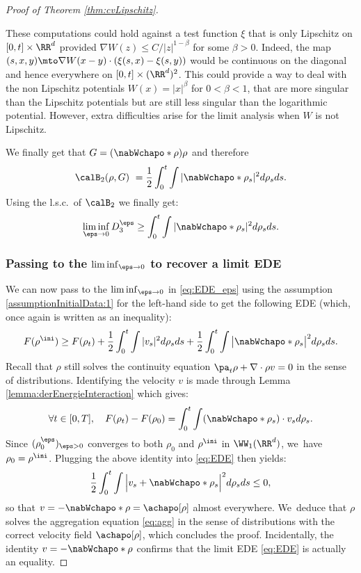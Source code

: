 \begin{proof}[Proof of Theorem \ref{thm:cvLipschitz}]
\begin{remark}
These computations could hold against a test function $\xi$ that is only Lipschitz on $[0,t] \times \RR^d$ provided $\nabla W(z) \leq C / |z|^{1-\beta}$ for some $\beta > 0$. Indeed, the map $(s,x,y) \mto \nabla W(x - y) \cdot \left( \xi(s, x) - \xi(s,y) \right)$ would be continuous on the diagonal and hence everywhere on $[0,t] \times (\RR^d)^2$. This could provide a way to deal with the non Lipschitz potentials $W(x) = |x|^\beta$ for $0<\beta<1$, that are more singular than the Lipschitz potentials but are still less singular than the logarithmic potential. However, extra difficulties arise for the limit analysis when $W$ is not Lipschitz.
\end{remark}

We finally get that $G = (\nabWchapo * \rho) \rho$ and therefore
\[
\calB_2(\rho, G)\ = \frac 12 \int_0^t \int |\nabWchapo * \rho_s|^2 d\rho_s ds.
\]
Using the l.s.c.\ of $\calB_2$ we finally get:
\[
\liminf_{\eps \to 0} D_3^\eps \geq \int_0^t \int |\nabWchapo * \rho_s|^2 d\rho_s ds.
\]
\subsubsection*{Passing to the $\liminf_{\eps \to 0}$ to recover a limit EDE}

We can now pass to the $\liminf_{\eps \to 0}$ in \eqref{eq:EDE_eps} using the assumption \eqref{assumptionInitialData:1} for the left-hand side to get the following EDE (which, once again is written as an inequality):
\begin{equation}\label{eq:EDE}
F(\rho^{\ini}) \geq F(\rho_t) + \frac 12 \int_0^t \int |v_s|^2 d\rho_s ds + \frac 12 \int_0^t \int \big| \nabWchapo * \rho_s \big|^2 d\rho_s ds.
\end{equation}
Recall that $\rho$ still solves the continuity equation $\pa_t \rho + \nabla \cdot \rho v = 0$ in the sense of distributions. Identifying the velocity $v$ is made through Lemma \ref{lemma:derEnergieInteraction} which gives:
\[
\forall t \in [0,T], \quad F(\rho_t) - F(\rho_0) = \int_0^t \int (\nabWchapo * \rho_s) \cdot v_s d\rho_s.
\]
Since $(\rho_0^\eps)_{\eps >0}$ converges to both $\rho_0$ and $\rho^{\ini}$ in $\WW_1(\RR^d)$, we~have $\rho_0 = \rho^{\ini}$. Plugging the above identity into \eqref{eq:EDE} then yields:
\[
\frac 12 \int_0^t \int \Big|v_s + \nabWchapo * \rho_s \Big|^2 d\rho_s ds \leq 0,
\]
so that $v = - \nabWchapo * \rho = \achapo[\rho]$ almost everywhere. We~deduce that $\rho$ solves the aggregation equation \eqref{eq:agg} in the sense of distributions with the correct velocity field $\achapo[\rho]$, which concludes the proof. Incidentally, the identity $v = - \nabWchapo * \rho$ confirms that the limit EDE \eqref{eq:EDE} is actually an equality.
\end{proof}

